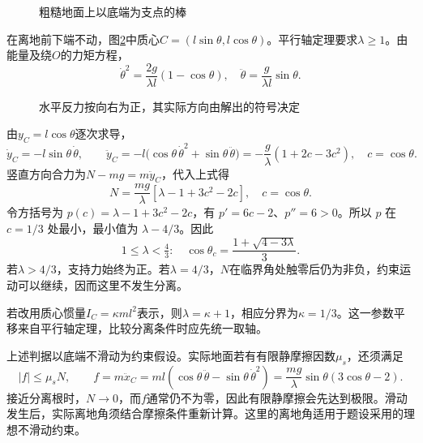 \begin{figure}[H]\centering
{}
\caption{粗糙地面上以底端为支点的棒}\label{fig:hw2-3-q}
\end{figure}

\begin{solution}
在离地前下端不动，图\ref{fig:hw2-3-s}中质心$C=(l\sin\theta,l\cos\theta)$。平行轴定理要求$\lambda\ge1$。由能量及绕$O$的力矩方程，
\[
 \dot\theta^2=\frac{2g}{\lambda l}(1-\cos\theta),\quad
 \ddot\theta=\frac g{\lambda l}\sin\theta.
\]

\begin{figure}[H]\centering
{}
\caption{水平反力按向右为正，其实际方向由解出的符号决定}\label{fig:hw2-3-s}
\end{figure}

由$y_C=l\cos\theta$逐次求导，
\[
\dot y_C=-l\sin\theta\,\dot\theta,\qquad
\ddot y_C=-l\bigl(\cos\theta\,\dot\theta^2+\sin\theta\,\ddot\theta\bigr)
=-\frac g\lambda(1+2c-3c^2),\quad c=\cos\theta.
\]
竖直方向合力为$N-mg=m\ddot y_C$，代入上式得
\[
 N=\frac{mg}{\lambda}[\lambda-1+3c^2-2c],\quad c=\cos\theta.
\]
令方括号为 $p(c)=\lambda-1+3c^2-2c$，有 $p'=6c-2$、$p''=6>0$。所以 $p$ 在 $c=1/3$ 处最小，最小值为 $\lambda-4/3$。因此
\[
 \boxed{1\le\lambda<\tfrac43:\quad
 \cos\theta_c=\frac{1+\sqrt{4-3\lambda}}3}.
\]
若$\lambda>4/3$，支持力始终为正。若$\lambda=4/3$，$N$在临界角处触零后仍为非负，约束运动可以继续，因而这里不发生分离。

若改用质心惯量$I_C=\kappa ml^2$表示，则$\lambda=\kappa+1$，相应分界为$\kappa=1/3$。这一参数平移来自平行轴定理，比较分离条件时应先统一取轴。

上述判据以底端不滑动为约束假设。实际地面若有有限静摩擦因数$\mu_s$，还须满足
\[
 |f|\le\mu_sN,\qquad
 f=m\ddot x_C=ml(\cos\theta\,\ddot\theta-\sin\theta\,\dot\theta^2)
 =\frac{mg}{\lambda}\sin\theta(3\cos\theta-2).
\]
接近分离根时，$N\to0$，而$f$通常仍不为零，因此有限静摩擦会先达到极限。滑动发生后，实际离地角须结合摩擦条件重新计算。这里的离地角适用于题设采用的理想不滑动约束。


\end{solution}




